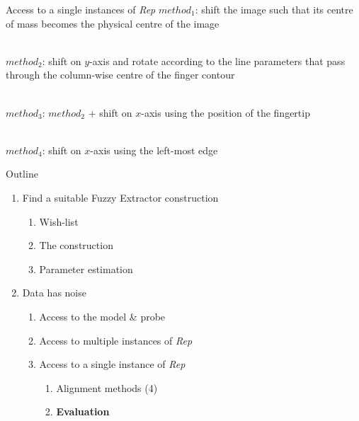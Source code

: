 \documentclass{beamer}
\def\fe{Fuzzy Extractor\xspace}
\newcommand{\rep}{\textit{Rep}\xspace}
\begin{document}
\begin{frame}{Access to a single instances of \rep}
$method_1$: shift the image such that its centre of mass becomes the physical centre of the image\\~\pause

$method_2$: shift on $y$-axis and rotate according to the line parameters that pass through the column-wise centre of the finger contour\\~\pause


$method_3$: $method_2$ + shift on $x$-axis using the position of the fingertip\\~\pause

$method_4$: shift on $x$-axis using the left-most edge %

\end{frame}
\begin{frame}{Outline}
   \begin{enumerate}
   \item Find a suitable \fe construction
\begin{enumerate}
    \item Wish-list
    \item The construction
    \item Parameter estimation\\
\end{enumerate}
   \item Data has noise
   \begin{enumerate}
       \item Access to the model \& probe
       \item Access to multiple instances of \rep
       \item Access to a single instance of \rep
        \begin{enumerate}
            \item Alignment methods (4)
            \item \textbf{Evaluation}
        \end{enumerate}
   \end{enumerate}    
\end{enumerate} 
\end{frame}
\end{document}
